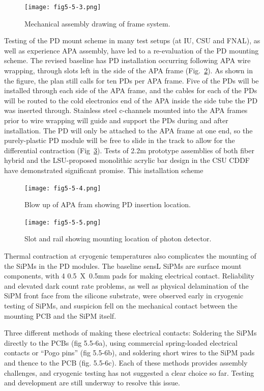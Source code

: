 \begin{figure}[h!]
  \centering
  \texttt{[image: fig5-5-3.png]}
\caption{Mechanical assembly drawing of frame system.}
\label{fig5.5-3}
\end{figure}

Testing of the PD mount scheme in many test setups (at IU, CSU and
FNAL), as well as experience APA assembly, have led to a re-evaluation
of the PD mounting scheme.  The revised baseline has PD installation
occurring following APA wire wrapping, through slots left in the side
of the APA frame (Fig.~\ref{fig5.5-4}).  As shown in the figure, the
plan still calls for ten PDs per APA frame.  Five of the PDs will be
installed through each side of the APA frame, and the cables for each
of the PDs will be routed to the cold electronics end of the APA
inside the side tube the PD was inserted through.  Stainless steel
c-channels mounted into the APA frames prior to wire wrapping will
guide and support the PDs during and after installation.  The PD will
only be attached to the APA frame at one end, so the purely-plastic PD
module will be free to slide in the track to allow for the
differential contraction (Fig~\ref{fig5.5-5}).  Tests of 2.2m prototype
assemblies of both fiber hybrid and the LSU-proposed monolithic
acrylic bar design in the CSU CDDF have demonstrated significant
promise.  This installation scheme

\begin{figure}[h!]
  \centering
  \texttt{[image: fig5-5-4.png]}
\caption{Blow up of APA fram showing PD insertion location.}
\label{fig5.5-4}
\end{figure}

\begin{figure}[h!]
  \centering
  \texttt{[image: fig5-5-5.png]}
\caption{Slot and rail showing mounting location of photon detector.}
\label{fig5.5-5}
\end{figure}

Thermal contraction at cryogenic temperatures also complicates the
mounting of the SiPMs in the PD modules.  The baseline sensL SiPMs are
surface mount components, with 4 0.5~X~0.5mm pads for making
electrical contact.  Reliability and elevated dark count rate
problems, as well as physical delamination of the SiPM front face from
the silicone substrate, were observed early in cryogenic testing of
SiPMs, and suspicion fell on the mechanical contact between the
mounting PCB and the SiPM itself.

Three different methods of making these electrical contacts: Soldering
the SiPMs directly to the PCBs (fig 5.5-6a), using commercial
spring-loaded electrical contacts or “Pogo pins” (fig 5.5-6b), and
soldering short wires to the SiPM pads and thence to the PCB
(fig. 5.5-6c).  Each of these methods provides assembly challenges,
and cryogenic testing has not suggested a clear choice so far.
Testing and development are still underway to resolve this issue.

